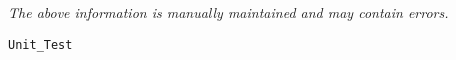 \label{pkg:unit\_test}

{\tiny \it The above information is manually maintained and may contain errors.}
\begin{verbatim}
Unit_Test
\end{verbatim}
